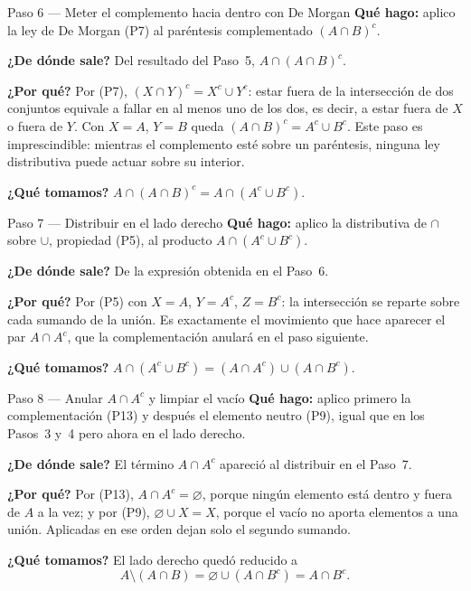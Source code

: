 \documentclass[11pt]{article}
\begin{document}
\begin{paso}{Paso 6 --- Meter el complemento hacia dentro con De Morgan}
\textbf{Qué hago:} aplico la ley de De Morgan (P7) al paréntesis complementado $(A\cap B)^{c}$.

\textbf{¿De dónde sale?} Del resultado del Paso~5, $A\cap(A\cap B)^{c}$.

\textbf{¿Por qué?} Por (P7), $(X\cap Y)^{c}=X^{c}\cup Y^{c}$: estar fuera de la intersección de
dos conjuntos equivale a fallar en al menos uno de los dos, es decir, a estar fuera de $X$ o
fuera de $Y$. Con $X=A$, $Y=B$ queda $(A\cap B)^{c}=A^{c}\cup B^{c}$. Este paso es
imprescindible: mientras el complemento esté sobre un paréntesis, ninguna ley distributiva puede
actuar sobre su interior.

\textbf{¿Qué tomamos?} $A\cap(A\cap B)^{c}=A\cap(A^{c}\cup B^{c})$.
\end{paso}

\begin{paso}{Paso 7 --- Distribuir en el lado derecho}
\textbf{Qué hago:} aplico la distributiva de $\cap$ sobre $\cup$, propiedad (P5), al producto
$A\cap(A^{c}\cup B^{c})$.

\textbf{¿De dónde sale?} De la expresión obtenida en el Paso~6.

\textbf{¿Por qué?} Por (P5) con $X=A$, $Y=A^{c}$, $Z=B^{c}$: la intersección se reparte sobre
cada sumando de la unión. Es exactamente el movimiento que hace aparecer el par $A\cap A^{c}$,
que la complementación anulará en el paso siguiente.

\textbf{¿Qué tomamos?} $A\cap(A^{c}\cup B^{c})=(A\cap A^{c})\cup(A\cap B^{c})$.
\end{paso}

\begin{paso}{Paso 8 --- Anular $A\cap A^{c}$ y limpiar el vacío}
\textbf{Qué hago:} aplico primero la complementación (P13) y después el elemento neutro (P9),
igual que en los Pasos~3 y~4 pero ahora en el lado derecho.

\textbf{¿De dónde sale?} El término $A\cap A^{c}$ apareció al distribuir en el Paso~7.

\textbf{¿Por qué?} Por (P13), $A\cap A^{c}=\varnothing$, porque ningún elemento está dentro y
fuera de $A$ a la vez; y por (P9), $\varnothing\cup X=X$, porque el vacío no aporta elementos a
una unión. Aplicadas en ese orden dejan solo el segundo sumando.

\textbf{¿Qué tomamos?} El lado derecho quedó reducido a
\[
A\setminus(A\cap B)=\varnothing\cup(A\cap B^{c})=A\cap B^{c}.
\]
\end{paso}
\end{document}
